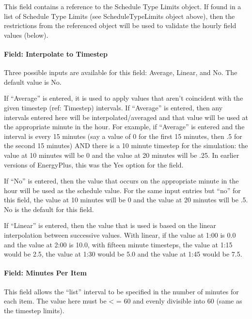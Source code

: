 This field contains a reference to the Schedule Type Limits object. If found in a list of Schedule Type Limits (see ScheduleTypeLimits object above), then the restrictions from the referenced object will be used to validate the hourly field values (below).

\paragraph{Field: Interpolate to Timestep}\label{field-interpolate-to-timestep-1}

Three possible inputs are available for this field: Average, Linear, and No. The default value is No.

If ``Average'' is entered, it is used to apply values that aren't coincident with the given timestep (ref: Timestep) intervals. If ``Average'' is entered, then any intervals entered here will be interpolated/averaged and that value will be used at the appropriate minute in the hour. For example, if ``Average'' is entered and the interval is every 15 minutes (say a value of 0 for the first 15 minutes, then .5 for the second 15 minutes) AND there is a 10 minute timestep for the simulation: the value at 10 minutes will be 0 and the value at 20 minutes will be .25. In earlier versions of EnergyPlus, this was the Yes option for the field.

If ``No'' is entered, then the value that occurs on the appropriate minute in the hour will be used as the schedule value. For the same input entries but ``no'' for this field, the value at 10 minutes will be 0 and the value at 20 minutes will be .5. No is the default for this field.

If ``Linear'' is entered, then the value that is used is based on the linear interpolation between successive values. With linear, if the value at 1:00 is 0.0 and the value at 2:00 is 10.0, with fifteen minute timesteps, the value at 1:15 would be 2.5, the value at 1:30 would be 5.0 and the value at 1:45 would be 7.5. 


\paragraph{Field: Minutes Per Item}\label{field-minutes-per-item}

This field allows the ``list'' interval to be specified in the number of minutes for each item. The value here must be \textless{} = 60 and evenly divisible into 60 (same as the timestep limits).

